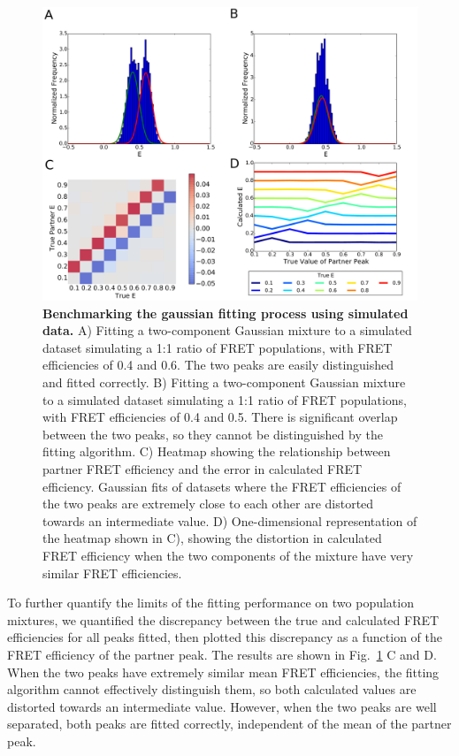 \begin{figure}[!ht]
   \begin{center}
      \includegraphics*[clip=true, width=6in]{pyFRET/benchmarking.pdf}
      \caption{{\bf Benchmarking the gaussian fitting process using simulated data.} A) Fitting a two-component Gaussian mixture to a simulated dataset simulating a 1:1 ratio of FRET populations, with FRET efficiencies of 0.4 and 0.6. The two peaks are easily distinguished and fitted correctly. B) Fitting a two-component Gaussian mixture to a simulated dataset simulating a 1:1 ratio of FRET populations, with FRET efficiencies of 0.4 and 0.5. There is significant overlap between the two peaks, so they cannot be distinguished by the fitting algorithm. C) Heatmap showing the relationship between partner FRET efficiency and the error in calculated FRET efficiency. Gaussian fits of datasets where the FRET efficiencies of the two peaks are extremely close to each other are distorted towards an intermediate value. D) One-dimensional representation of the heatmap shown in C), showing the distortion in calculated FRET efficiency when the two components of the mixture have very similar FRET efficiencies.}
      \label{fig:fig_benchmarking}
   \end{center}
\end{figure}

To further quantify the limits of the fitting performance on two population mixtures, we quantified the discrepancy between the true and calculated FRET efficiencies for all peaks fitted, then plotted this discrepancy as a function of the FRET efficiency of the partner peak. The results are shown in Fig.~\ref{fig:fig_benchmarking} C and D. When the two peaks have extremely similar mean FRET efficiencies, the fitting algorithm cannot effectively distinguish them, so both calculated values are distorted towards an intermediate value. However, when the two peaks are well separated, both peaks are fitted correctly, independent of the mean of the partner peak.

